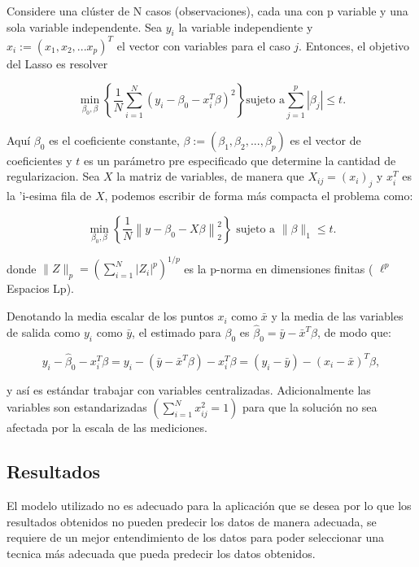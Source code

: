 \documentclass[11pt]{article}
\begin{document}
\cite{wiki:LASSO_estadística} Considere una clúster de N casos
(observaciones), cada una con p variable y una sola variable
independente. Sea \(y_i\) la variable independiente y
\(x_i := (x_1,x_2, ... x_p)^T\) el vector con variables para el caso
\(j\). Entonces, el objetivo del Lasso es resolver

\[
\min_{\beta_0, \beta}
\left\{
\frac{1}{N} \sum^N_{i=1}(y_i - \beta_0 -x_i^T \beta)^2
\right\}
\text{sujeto a}
\sum_{j=1}^p | \beta_j | \leq t.
\]

Aquí \(\beta_0\) es el coeficiente constante,
\(\beta:=(\beta_{1}, \beta_{2},..., \beta_{p})\) es el vector de coeficientes
y \(t\) es un parámetro pre especificado que determine la cantidad de
regularizacion. Sea \(X\) la matriz de variables, de manera que
\(\displaystyle X_{ij}=(x_{i})_{j}\) y \(x_{i}^{T}\) es la 'i-esima
fila de \(X\), podemos escribir de forma más compacta el problema
como: 

\[
\min _{\beta _{0},\beta }\left\{{\frac {1}{N}}\left\|y-\beta
_{0}-X\beta \right\|_{2}^{2}\right\}{\text{ sujeto a }}\|\beta
\|_{1}\leq t.
\]


donde \(\|Z\|_{p}=\left(\sum _{i=1}^{N}|Z_{i}|^{p}\right)^{1/p}\)
es la p-norma en dimensiones finitas ( \(\displaystyle \ell ^{p}\) Espacios Lp).

Denotando la media escalar de los puntos \(x_{i}\) como \({\bar {x}}\)
y la media de las variables de salida como \(y_i\) como
\({\bar{y}}\), el estimado para \(\beta_0\) es \({\hat {\beta }}_{0}={\bar
{y}}-{\bar {x}}^{T}\beta\), de modo que:

\[
y_{i}-{\hat {\beta }}_{0}-x_{i}^{T}\beta =y_{i}-({\bar {y}}
-{\bar {x}}^{T}\beta )-x_{i}^{T}\beta
=(y_{i}-{\bar {y}})-(x_{i}-{\bar {x}})^{T}\beta ,
\]

y así es estándar trabajar con variables centralizadas. Adicionalmente
las variables son estandarizadas \(\left(\sum _{i=1}^{N}x_{ij}^{2}=1\right)\)
para que la solución no sea afectada por la escala de las mediciones.

\subsection{Resultados}
\label{sec:org66cd1bc}
El modelo utilizado no es adecuado para la aplicación que se desea por
lo que los resultados obtenidos no pueden predecir los datos de manera
adecuada, se requiere de un mejor entendimiento de los datos para
poder seleccionar una tecnica más adecuada que pueda predecir los
datos obtenidos.
\end{document}
